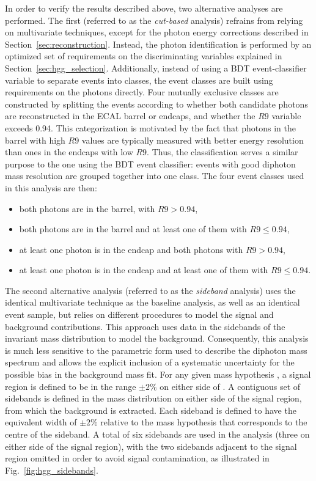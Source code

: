 \documentclass[12pt,twoside,a4paper,cmspaper,final,collab]{cms-tdr}
\begin{document}
In order to verify the results described above, two alternative analyses are performed.
The first (referred to as the {\it cut-based} analysis) refrains from relying on multivariate
techniques, except for the photon energy corrections described in Section~\ref{sec:reconstruction}.
Instead, the photon identification is performed by an optimized set of requirements on the
discriminating variables explained in Section~\ref{sec:hgg_selection}. Additionally, instead of using a BDT
event-classifier variable to separate events into classes, the event classes are built using requirements
on the photons directly. Four mutually exclusive classes are constructed by splitting the events according
to whether  both candidate photons are reconstructed in the ECAL barrel
or endcaps, and  whether the  $R9$ variable exceeds 0.94.
This categorization is motivated by the fact that photons in the barrel with high $R9$ values
are typically measured with better energy resolution than ones in the endcaps  with low $R9$.
Thus, the classification serves a similar purpose to the one
using the BDT event classifier: events with good diphoton mass resolution are grouped together into one class.
The four event classes used in this analysis are then:
\begin{itemize}
\item both photons are in the barrel, with $R9>0.94$,
\item both photons are in the barrel and at least one of them with $R9\leq0.94$,
\item at least one photon is in the endcap and both photons with $R9>0.94$,
\item at least one photon is in the endcap and at least one of them with $R9\leq0.94$.
\end{itemize}
The second alternative analysis (referred to as the {\it sideband} analysis)
uses the identical multivariate technique as the baseline analysis, as well as
an identical event sample, but relies on different procedures to model the signal and background contributions.
This approach uses data in the sidebands of the invariant mass distribution to model the background.
Consequently, this analysis is much less sensitive to the parametric form used to describe the diphoton
mass spectrum and allows the explicit inclusion of a systematic uncertainty for the possible bias in the
background mass fit.
For any given mass hypothesis \mH, a signal region is defined to be in
the range ${\pm}2\%$
on either side of \mH.
A contiguous set of sidebands is defined in the mass distribution on either side of the signal region, from
which the background is extracted.
Each sideband is defined to have the equivalent width of ${\pm}2\%$ relative to the mass hypothesis
that corresponds to the centre of the sideband.  A total of six sidebands are used in the analysis
(three on either side of the signal region), with the two sidebands adjacent to the
signal region omitted in order to avoid signal contamination, as
illustrated in Fig.~\ref{fig:hgg_sidebands}.
\end{document}
